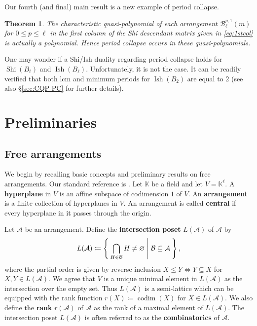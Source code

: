 \documentclass[11pt]{article}
\newtheorem{theorem}[theo]{Theorem}
\theoremstyle{definition}
\numberwithin{equation}{section}
\DeclareMathOperator{\Shi}{Shi}
\DeclareMathOperator{\Ish}{Ish}
\newcommand{\A}{\mathcal{A}}
\newcommand{\B}{\mathcal{B}}
\begin{document}
Our fourth (and final) main result is a new example of period collapse.
\begin{theorem}
 \label{thm:1stcol-PC-intro}
The characteristic quasi-polynomial of each arrangement $\B^{p,1}_\ell(m)$ for $0 \le p \le \ell$ in the first column of the Shi descendant matrix given in \eqref{eq:1stcol} is actually a polynomial. 
Hence period collapse occurs in these quasi-polynomials. 
 \end{theorem} 

One may wonder if a Shi/Ish duality regarding period collapse holds for $\Shi(B_{\ell})$ and $\Ish(B_{\ell})$. 
Unfortunately, it is not the case. 
It can be readily verified that both lcm and minimum periods for $\Ish(B_{2})$ are equal to $2$ (see also \S\ref{sec:CQP-PC} for further details).

\section{Preliminaries}
\label{sec:free-arr}

\subsection{Free arrangements}
\label{subsec:free}
We begin by recalling basic concepts and preliminary results on free arrangements. Our standard reference is \cite{OT92}.
Let $ \mathbb{K} $ be a field and let $V=  \mathbb{K}^{\ell} $. 
A \textbf{hyperplane} in $V$ is an affine subspace of codimension $1$ of $V$.
An \textbf{arrangement} is a finite collection of hyperplanes in  $ V $. 
An arrangement is called \textbf{central} if every hyperplane in it passes through the origin. 

Let  $ \mathcal{A} $ be an arrangement.
Define the \textbf{intersection poset} $ L(\mathcal{A}) $ of $ \mathcal{A} $ by 
\begin{align*}
L(\mathcal{A})  \coloneqq \Set{\bigcap_{H \in \mathcal{B}}H \neq \varnothing |  \mathcal{B} \subseteq \mathcal{A} },
\end{align*}
where the partial order is given by reverse inclusion $X\le Y\Leftrightarrow Y\subseteq X$ for $X, Y \in L(\A)$. 
We agree that $ V $ is a unique minimal element in $ L(\mathcal{A}) $ as the intersection over the empty set. 
Thus $ L(\mathcal{A}) $ is a semi-lattice which can be equipped with the rank function $ r(X)  \coloneqq \operatorname{codim}(X) $ for $X \in L(\mathcal{A})$. 
We also define the \textbf{rank} $r(\A)$ of $\A$ as the rank of a maximal element of $L(\A)$.
The intersection poset $ L(\mathcal{A}) $ is often referred to as the  \textbf{combinatorics} of  $ \mathcal{A} $. 
\end{document}
